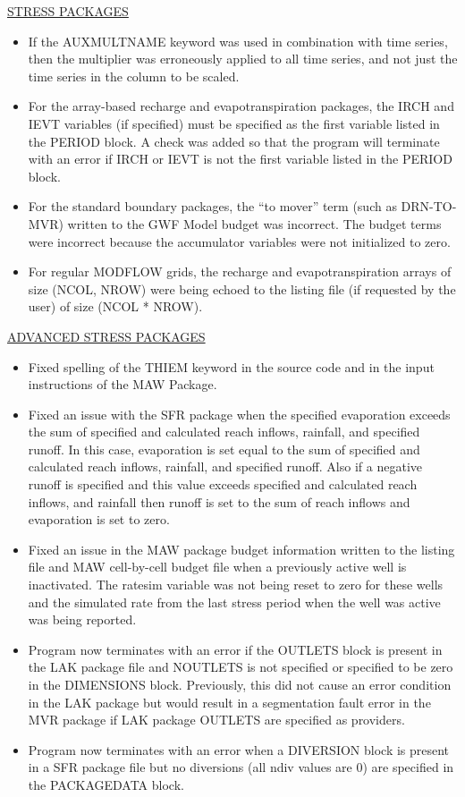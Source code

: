\documentclass[11pt,twoside,twocolumn]{usgsreport}
\begin{document}
\begin{itemize}
\underline{STRESS PACKAGES}
\begin{itemize}
\item If the AUXMULTNAME keyword was used in combination with time series, then the multiplier was erroneously applied to all time series, and not just the time series in the column to be scaled.  
\item For the array-based recharge and evapotranspiration packages, the IRCH and IEVT variables (if specified) must be specified as the first variable listed in the PERIOD block.  A check was added so that the program will terminate with an error if IRCH or IEVT is not the first variable listed in the PERIOD block.
\item For the standard boundary packages, the ``to mover'' term (such as DRN-TO-MVR) written to the GWF Model budget was incorrect.  The budget terms were incorrect because the accumulator variables were not initialized to zero. 
\item For regular MODFLOW grids, the recharge and evapotranspiration arrays of size (NCOL, NROW) were being echoed to the listing file (if requested by the user) of size (NCOL * NROW). 
\end{itemize}

\underline{ADVANCED STRESS PACKAGES}
\begin{itemize}
\item Fixed spelling of the THIEM keyword in the source code and in the input instructions of the MAW Package.
\item Fixed an issue with the SFR package when the specified evaporation exceeds the sum of specified and calculated reach inflows, rainfall, and specified runoff. In this case, evaporation is set equal to the sum of specified and calculated reach inflows, rainfall, and specified runoff. Also if a negative runoff is specified and this value exceeds specified and calculated reach inflows, and rainfall then runoff is set to the sum of reach inflows and evaporation is set to zero.
\item Fixed an issue in the MAW package budget information written to the listing file and MAW cell-by-cell budget file when a previously active well is inactivated. The ratesim variable was not being reset to zero for these wells and the simulated rate from the last stress period when the well was active was being reported.
\item Program now terminates with an error if the OUTLETS block is present in the LAK package file and NOUTLETS is not specified or specified to be zero in the DIMENSIONS block.  Previously, this did not cause an error condition in the LAK package but would result in a segmentation fault error in the MVR package if LAK package OUTLETS are specified as providers.
\item Program now terminates with an error when a DIVERSION block is present in a SFR package file but no diversions (all ndiv values are 0) are specified in the PACKAGEDATA block. 
\end{itemize}


\end{itemize}
\end{document}
